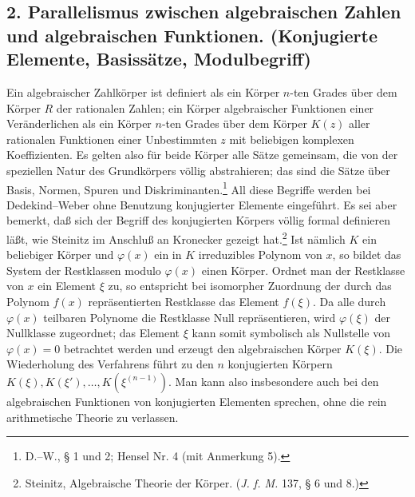 \documentclass[11pt]{article}
\begin{document}
\subsection*{2. Parallelismus zwischen algebraischen Zahlen und algebraischen Funktionen. (Konjugierte Elemente, Basissätze, Modulbegriff)}
Ein algebraischer Zahlkörper ist definiert als ein Körper \(n\)-ten Grades über dem Körper \(R\) der rationalen Zahlen; ein Körper algebraischer Funktionen einer Veränderlichen als ein Körper \(n\)-ten Grades über dem Körper \(K(z)\) aller rationalen Funktionen einer Unbestimmten \(z\) mit beliebigen komplexen Koeffizienten. Es gelten also für beide Körper alle Sätze gemeinsam, die von der speziellen Natur des Grundkörpers völlig abstrahieren; das sind die Sätze über Basis, Normen, Spuren und Diskriminanten.\footnote{D.--W., § 1 und 2; Hensel Nr. 4 (mit Anmerkung 5).} All diese Begriffe werden bei Dedekind--Weber ohne Benutzung konjugierter Elemente eingeführt. Es sei aber bemerkt, daß sich der Begriff des konjugierten Körpers völlig formal definieren läßt, wie Steinitz im Anschluß an Kronecker gezeigt hat.\footnote{Steinitz, Algebraische Theorie der Körper. (\emph{J. f. M.} 137, § 6 und 8.)} Ist nämlich \(K\) ein beliebiger Körper und \(\varphi(x)\) ein in \(K\) irreduzibles Polynom von \(x\), so bildet das System der Restklassen modulo \(\varphi(x)\) einen Körper. Ordnet man der Restklasse von \(x\) ein Element \(\xi\) zu, so entspricht bei isomorpher Zuordnung der durch das Polynom \(f(x)\) repräsentierten Restklasse das Element \(f(\xi)\). Da alle durch \(\varphi(x)\) teilbaren Polynome die Restklasse Null repräsentieren, wird \(\varphi(\xi)\) der Nullklasse zugeordnet; das Element \(\xi\) kann somit symbolisch als Nullstelle von \(\varphi(x)=0\) betrachtet werden und erzeugt den algebraischen Körper \(K(\xi)\). Die Wiederholung des Verfahrens führt zu den \(n\) konjugierten Körpern \(K(\xi), K(\xi'),\ldots,K(\xi^{(n-1)})\). Man kann also insbesondere auch bei den algebraischen Funktionen von konjugierten Elementen sprechen, ohne die rein arithmetische Theorie zu verlassen.
\end{document}
